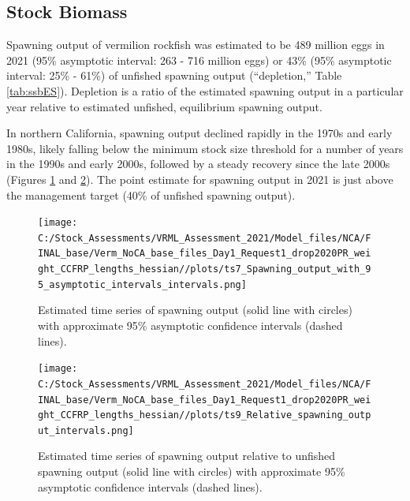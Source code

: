 \documentclass[11pt,
  english,
]{article}
\begin{document}
\FloatBarrier


\hypertarget{stock-biomass}{%
\subsection*{Stock Biomass}\label{stock-biomass}}

\leavevmode\tagmcend\tagstructend

Spawning output of vermilion rockfish was estimated to be 489 million eggs in 2021 (95\% asymptotic interval: 263 - 716 million eggs) or 43\% (95\% asymptotic interval: 25\% - 61\%) of unfished spawning output (``depletion,'' Table \ref{tab:ssbES}). Depletion is a ratio of the estimated spawning output in a particular year relative to estimated unfished, equilibrium spawning output.

In northern California, spawning output declined rapidly in the 1970s and early 1980s, likely falling below the minimum stock size threshold for a number of years in the 1990s and early 2000s, followed by a steady recovery since the late 2000s (Figures \ref{fig:ssbES} and \ref{fig:deplES}). The point estimate for spawning output in 2021 is just above the management target (40\% of unfished spawning output).

\begin{figure}
\centering
\texttt{[image: C:/Stock\_Assessments/VRML\_Assessment\_2021/Model\_files/NCA/FINAL\_base/Verm\_NoCA\_base\_files\_Day1\_Request1\_drop2020PR\_weight\_CCFRP\_lengths\_hessian//plots/ts7\_Spawning\_output\_with\_95\_asymptotic\_intervals\_intervals.png]}
\caption{Estimated time series of spawning output (solid line with circles) with approximate 95\% asymptotic confidence intervals (dashed lines).\label{fig:ssbES}}
\end{figure}

\begin{figure}
\centering
\texttt{[image: C:/Stock\_Assessments/VRML\_Assessment\_2021/Model\_files/NCA/FINAL\_base/Verm\_NoCA\_base\_files\_Day1\_Request1\_drop2020PR\_weight\_CCFRP\_lengths\_hessian//plots/ts9\_Relative\_spawning\_output\_intervals.png]}
\caption{Estimated time series of spawning output relative to unfished spawning output (solid line with circles) with approximate 95\% asymptotic confidence intervals (dashed lines).\label{fig:deplES}}
\end{figure}
\end{document}
